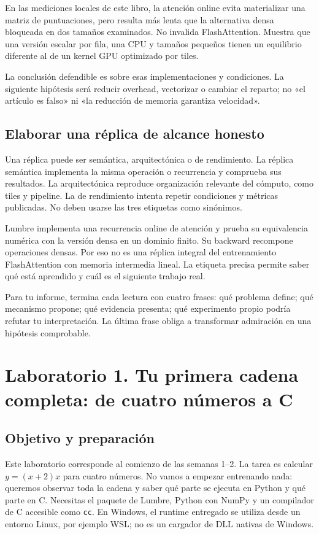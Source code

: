 \documentclass[12pt,a4paper,oneside]{report}
\begin{document}
\begin{ejemplo}
En las mediciones locales de este libro, la atención online evita materializar una matriz de puntuaciones, pero resulta más lenta que la alternativa densa bloqueada en dos tamaños examinados. No invalida FlashAttention. Muestra que una versión escalar por fila, una CPU y tamaños pequeños tienen un equilibrio diferente al de un kernel GPU optimizado por tiles.

La conclusión defendible es sobre esas implementaciones y condiciones. La siguiente hipótesis será reducir overhead, vectorizar o cambiar el reparto; no «el artículo es falso» ni «la reducción de memoria garantiza velocidad».

\end{ejemplo}
\section{Elaborar una réplica de alcance honesto}
Una réplica puede ser semántica, arquitectónica o de rendimiento. La réplica semántica implementa la misma operación o recurrencia y comprueba sus resultados. La arquitectónica reproduce organización relevante del cómputo, como tiles y pipeline. La de rendimiento intenta repetir condiciones y métricas publicadas. No deben usarse las tres etiquetas como sinónimos.

Lumbre implementa una recurrencia online de atención y prueba su equivalencia numérica con la versión densa en un dominio finito. Su backward recompone operaciones densas. Por eso no es una réplica integral del entrenamiento FlashAttention con memoria intermedia lineal. La etiqueta precisa permite saber qué está aprendido y cuál es el siguiente trabajo real.

Para tu informe, termina cada lectura con cuatro frases: qué problema define; qué mecanismo propone; qué evidencia presenta; qué experimento propio podría refutar tu interpretación. La última frase obliga a transformar admiración en una hipótesis comprobable.


\chapter{Laboratorio 1. Tu primera cadena completa: de cuatro números a C}
\label{lab:uno}
\section{Objetivo y preparación}
Este laboratorio corresponde al comienzo de las semanas 1--2. La tarea es calcular $y=(x+2)x$ para cuatro números. No vamos a empezar entrenando nada: queremos observar toda la cadena y saber qué parte se ejecuta en Python y qué parte en C. Necesitas el paquete de Lumbre, Python con NumPy y un compilador de C accesible como \texttt{cc}. En Windows, el runtime entregado se utiliza desde un entorno Linux, por ejemplo WSL; no es un cargador de DLL nativas de Windows.
\end{document}
